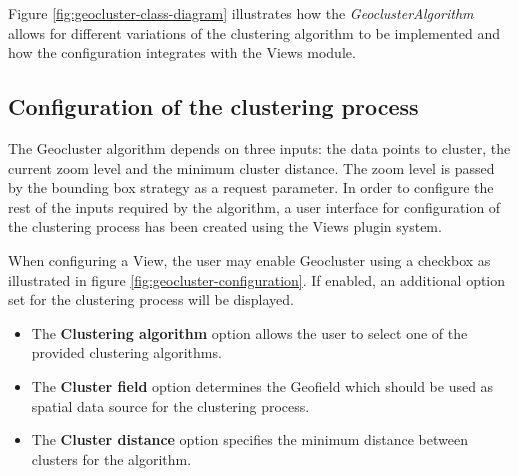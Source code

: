 Figure \ref{fig:geocluster-class-diagram} illustrates how the \textit{GeoclusterAlgorithm} allows for different variations of the clustering algorithm to be implemented and how the configuration integrates with the Views module. 


\subsection{Configuration of the clustering process}

The Geocluster algorithm depends on three inputs: the data points to cluster, the current zoom level and the minimum cluster distance. The zoom level is passed by the bounding box strategy as a request parameter. In order to configure the rest of the inputs required by the algorithm, a user interface for configuration of the clustering process has been created using the Views plugin system.

When configuring a View, the user may enable Geocluster using a checkbox as illustrated in figure \ref{fig:geocluster-configuration}. If enabled, an additional option set for the clustering process will be displayed.

\begin{itemize}

\item The \textbf{Clustering algorithm} option allows the user to select one of the provided clustering algorithms.

\item The \textbf{Cluster field} option determines the Geofield which should be used as spatial data source for the clustering process. 

\item The \textbf{Cluster distance} option specifies the minimum distance between clusters for the algorithm.

\end{itemize}

